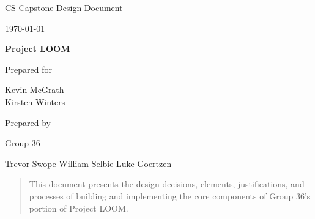 \documentclass[onecolumn, draftclsnofoot,10pt, compsoc]{IEEEtran}
\def \CapstoneTeamName{		}
\def \CapstoneTeamNumber{		36}
\def \GroupMemberOne{			Trevor Swope}
\def \GroupMemberTwo{			William Selbie}
\def \GroupMemberThree{			Luke Goertzen}
\def \CapstoneProjectName{		Project LOOM}
\def \CapstoneSponsorPerson{	Chet Udell}
\def \DocType{	%
				Design Document
				}
\newcommand{\NameSigPair}[1]{\par
\makebox[2.75in][r]{#1} \hfil 	\makebox[3.25in]{\makebox[2.25in]{\hrulefill} \hfill		\makebox[.75in]{\hrulefill}}
\par\vspace{-12pt} \textit{\tiny\noindent
\makebox[2.75in]{} \hfil		\makebox[3.25in]{\makebox[2.25in][r]{Signature} \hfill	\makebox[.75in][r]{Date}}}}
\begin{document}
\begin{titlepage}
    \begin{singlespace}
        \hfill 
        \par\vspace{.2in}
        \centering
        \scshape{
            \huge CS Capstone \DocType \par
            {\large\today}\par
            \vspace{.5in}
            \textbf{\Huge\CapstoneProjectName}\par
            \vfill
            {\large Prepared for}\par
            \Huge Kevin McGrath \\ Kirsten Winters \par
            \vspace{5pt}
            {\large Prepared by }\par
            Group\CapstoneTeamNumber\par
            \CapstoneTeamName\par 
            \vspace{5pt}
            \GroupMemberOne
            \GroupMemberTwo
            \GroupMemberThree
            \vspace{20pt}
        }
        \begin{abstract}
            This document presents the design decisions, elements, justifications, and processes of building and implementing the core components of Group 36's portion of Project LOOM.
        \end{abstract}     
    \end{singlespace}
\end{titlepage}
\newpage
{}
\tableofcontents
\clearpage
\end{document}
